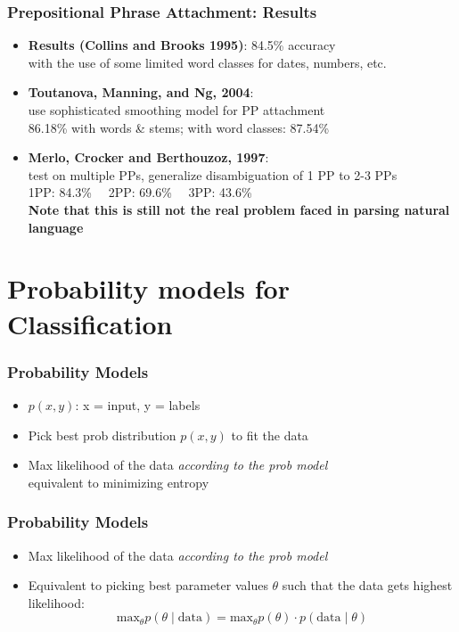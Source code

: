 \begin{frame}
\frametitle{Prepositional Phrase Attachment: Results}
  \begin{itemize}[<+->]
  \item {\bf Results (Collins and Brooks 1995)}: 84.5\% accuracy \\
  with the use of some limited word classes for dates, numbers, etc.
  \item {\bf Toutanova, Manning, and Ng, 2004}: \\
use sophisticated smoothing model for PP attachment\\
86.18\% with words \& stems; with word classes: 87.54\%
  \item {\bf Merlo, Crocker and Berthouzoz, 1997}:\\
 test on multiple PPs, generalize disambiguation of 1 PP to 2-3 PPs\\
1PP: 84.3\% \ \ 2PP: 69.6\% \ \ 3PP: 43.6\% \\
{\bf Note that this is still not the real problem faced in parsing natural language}
  \end{itemize}
\end{frame}

\section{Probability models for Classification}
\frame{\tableofcontents[currentsection]}

\begin{frame}
\frametitle{Probability Models}
\begin{itemize}[<+->]
\item $p(x,y)$: x = input, y = labels
\item Pick best prob distribution $p(x,y)$ to fit the data
\item Max likelihood of the data {\em according to the prob model} \\
equivalent to minimizing entropy
\end{itemize}
\end{frame}

\begin{frame}
\frametitle{Probability Models}
\begin{itemize}[<+->]
\item Max likelihood of the data {\em according to the prob model}
\item Equivalent to picking best parameter values $\theta$ such that
  the data gets highest likelihood:\\
\[ \textrm{max}_\theta p(\theta \mid \textrm{data} ) = \textrm{max}_\theta
  p(\theta) \cdot p(\textrm{data} \mid \theta) \]
\end{itemize}
\end{frame}

